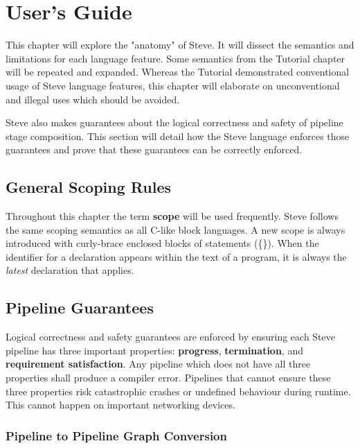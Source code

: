 \chapter{User's Guide} \label{users_guide}

This chapter will explore the "anatomy" of Steve. It will dissect the semantics and limitations for each language feature. Some semantics from the Tutorial chapter will be repeated and expanded. Whereas the Tutorial demonstrated conventional usage of Steve language features, this chapter will elaborate on unconventional and illegal uses which should be avoided.

Steve also makes guarantees about the logical correctness and safety of pipeline stage composition. This section will detail how the Steve language enforces those guarantees and prove that these guarantees can be correctly enforced.

\section{General Scoping Rules} \label{scope_guide}

Throughout this chapter the term \textbf{scope} will be used frequently. Steve follows the same scoping semantics as all C-like block languages. A new scope is always introduced with curly-brace enclosed blocks of statements (\{\}). When the identifier for a declaration appears within the text of a program, it is always the \textit{latest} declaration that applies.

\section{Pipeline Guarantees} \label{pipeline_checking_guide}

Logical correctness and safety guarantees are enforced by ensuring each Steve pipeline has three important properties: \textbf{progress}, \textbf{termination}, and \textbf{requirement satisfaction}. Any pipeline which does not have all three properties shall produce a compiler error. Pipelines that cannot ensure these three properties risk catastrophic crashes or undefined behaviour during runtime. This cannot happen on important networking devices.

\subsection{Pipeline to Pipeline Graph Conversion} \label{pipeline_graph}

